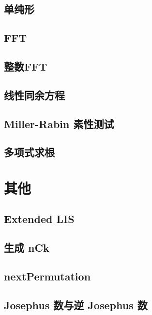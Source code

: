\documentclass[10pt, a4paper]{article}
\begin{document}
	\subsection{单纯形}
		

	\subsection{FFT}
		

	\subsection{整数FFT}
		

	\subsection{线性同余方程}
		

	\subsection{Miller-Rabin 素性测试}
		

	\subsection{多项式求根}
		
	
\section{其他}
	\subsection{Extended LIS}
		

	\subsection{生成 nCk}
		

	\subsection{nextPermutation}
		

	\subsection{Josephus 数与逆 Josephus 数}
		
	
\end{document}

